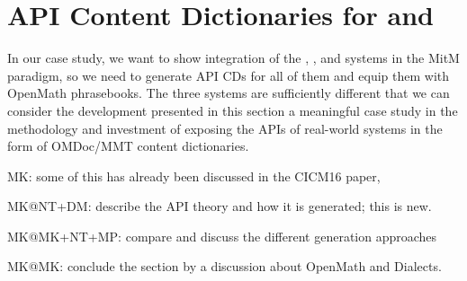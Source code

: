 \section{API Content Dictionaries for \GAP and \Sage}\label{sec:apit}
In our case study, we want to show integration of the \GAP, \Singular, and \Sage systems
in the MitM paradigm, so we need to generate API CDs for all of them and equip them with
OpenMath phrasebooks. The three systems are sufficiently different that we can consider
the development presented in this section a meaningful case study in the methodology and
investment of exposing the APIs of real-world systems in the form of OMDoc/MMT content
dictionaries.

\begin{todolist}{MK: some of this has already been discussed in the CICM16 paper, }
\item MK@NT+DM: describe the \Sage API theory and how it is generated; this is
  new. 
\item MK@MK+NT+MP: compare and discuss the different generation approaches
\item MK@MK: conclude the section by a discussion about OpenMath and Dialects.
\end{todolist}


